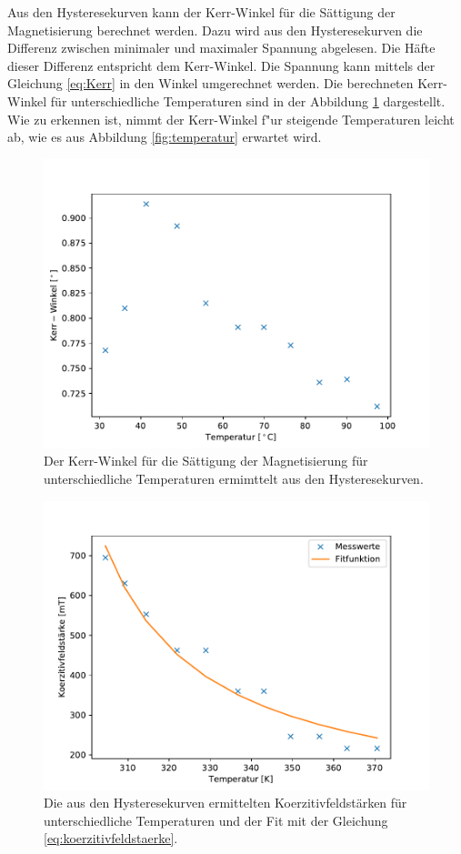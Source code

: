 Aus den Hysteresekurven kann der Kerr-Winkel für die Sättigung der Magnetisierung berechnet werden.
Dazu wird aus den Hysteresekurven die Differenz zwischen minimaler und maximaler Spannung abgelesen.
Die Häfte dieser Differenz entspricht dem Kerr-Winkel.
Die Spannung kann mittels der Gleichung \eqref{eq:Kerr} in den Winkel umgerechnet werden.
Die berechneten Kerr-Winkel für unterschiedliche Temperaturen sind in der Abbildung \ref{fig:Kerr_Winkel} dargestellt.
Wie zu erkennen ist, nimmt der Kerr-Winkel f"ur steigende Temperaturen leicht ab, wie es aus Abbildung \vref{fig:temperatur} erwartet wird.
\begin{figure}[H]
\centering
\includegraphics[scale=0.8]{../Messdaten/auswertung/Kerr_Winkel.pdf}
\caption{Der Kerr-Winkel für die Sättigung der Magnetisierung für unterschiedliche Temperaturen ermimttelt aus den Hysteresekurven.}
\label{fig:Kerr_Winkel}
\end{figure}


\begin{figure}[H]
\centering
\includegraphics[scale=0.8]{../Messdaten/auswertung/Kompensationstemperatur.pdf}
\caption{Die aus den Hysteresekurven ermittelten Koerzitivfeldstärken für unterschiedliche Temperaturen 
und der Fit mit der Gleichung \eqref{eq:koerzitivfeldstaerke}.}
\label{fig:koerzitivfeldstaerke}
\end{figure}

